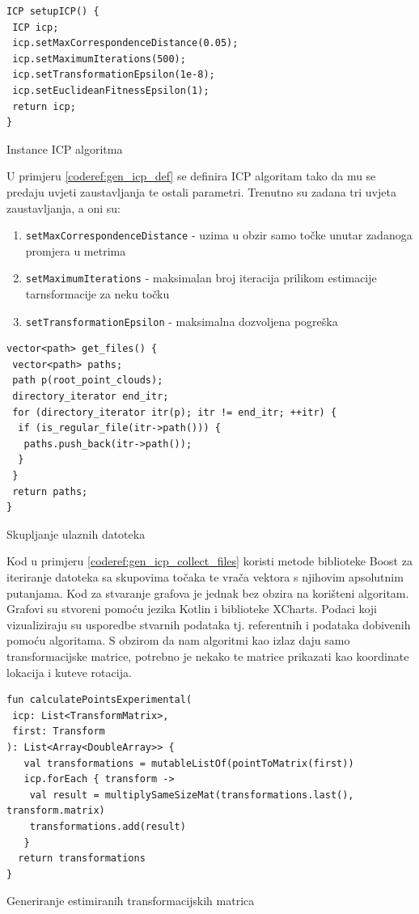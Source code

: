 \begin{listing}[h!]
  \begin{verbatim}
ICP setupICP() {
 ICP icp;
 icp.setMaxCorrespondenceDistance(0.05);
 icp.setMaximumIterations(500);
 icp.setTransformationEpsilon(1e-8);
 icp.setEuclideanFitnessEpsilon(1);
 return icp;
}
  \end{verbatim}
  \caption{Instance ICP algoritma}
  \label{coderef:gen_icp_def}
\end{listing}
\pagebreak
U primjeru \ref{coderef:gen_icp_def} se definira ICP algoritam tako da mu se predaju uvjeti zaustavljanja te ostali parametri. Trenutno su zadana tri uvjeta zaustavljanja, a oni su:

\begin{enumerate}
  \item \texttt{setMaxCorrespondenceDistance} - uzima u obzir samo točke unutar zadanoga promjera u metrima
  \item \texttt{setMaximumIterations} - maksimalan broj iteracija prilikom estimacije tarnsformacije za neku točku
  \item \texttt{setTransformationEpsilon} - maksimalna dozvoljena pogreška
\end{enumerate}

\begin{listing}[h!]
  \begin{verbatim}
vector<path> get_files() {
 vector<path> paths;
 path p(root_point_clouds);
 directory_iterator end_itr;
 for (directory_iterator itr(p); itr != end_itr; ++itr) {
  if (is_regular_file(itr->path())) {
   paths.push_back(itr->path());
  }
 }
 return paths;
}
  \end{verbatim}
  \caption{Skupljanje ulaznih datoteka}
  \label{coderef:gen_icp_collect_files}
\end{listing}
\pagebreak
Kod u primjeru \ref{coderef:gen_icp_collect_files} koristi metode biblioteke Boost\cite{boost} za iteriranje datoteka sa skupovima točaka te vrača vektora s njihovim apsolutnim putanjama. Kod za stvaranje grafova je jednak bez obzira na korišteni algoritam. Grafovi su stvoreni pomoću jezika Kotlin i biblioteke XCharts. Podaci koji vizualiziraju su usporedbe stvarnih podataka tj. referentnih i podataka dobivenih pomoću algoritama. S obzirom da nam algoritmi kao izlaz daju samo transformacijske matrice, potrebno je nekako te matrice prikazati kao koordinate lokacija i kuteve rotacija.

\begin{listing}[h!]
  \begin{verbatim}
fun calculatePointsExperimental(
 icp: List<TransformMatrix>,
 first: Transform
): List<Array<DoubleArray>> {
   val transformations = mutableListOf(pointToMatrix(first))
   icp.forEach { transform ->
    val result = multiplySameSizeMat(transformations.last(), transform.matrix)
    transformations.add(result)
   }
  return transformations
}
  \end{verbatim}
  \caption{Generiranje estimiranih transformacijskih matrica}
  \label{kotlin:gen_est_loc}
\end{listing}

